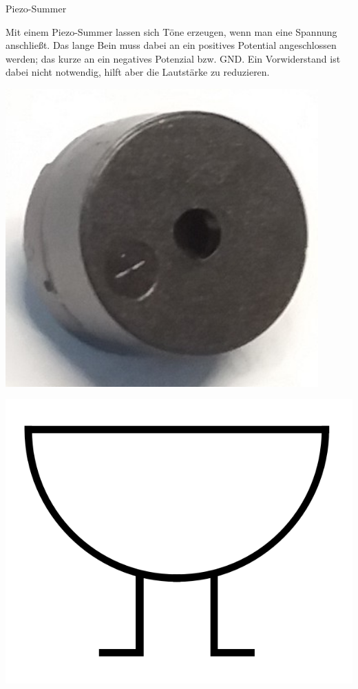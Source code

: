 \begin{zsfg}{Piezo-Summer}

	\begin{minipage}{0.7\textwidth}
		Mit einem Piezo-Summer lassen sich Töne erzeugen, wenn man eine Spannung anschließt. Das lange Bein muss dabei an ein positives Potential angeschlossen werden; das kurze an ein negatives Potenzial bzw. GND. Ein Vorwiderstand ist dabei nicht notwendig, hilft aber die Lautstärke zu reduzieren.
	\end{minipage}
	\hfill
	\begin{minipage}{0.28\textwidth}
		\begin{minipage}{0.48\textwidth}
			\centering
			\includegraphics[width=0.9\textwidth]{./pics/piezo-summer.jpg}
		\end{minipage}
		\hfill
		\begin{minipage}{0.48\textwidth}
			\centering
			\includegraphics[width=\textwidth]{./pics/piezo-schaltsymbol.png}
		\end{minipage}
	\end{minipage}
	

\end{zsfg}
